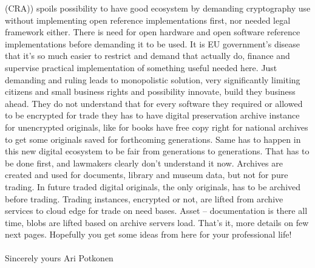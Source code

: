 (CRA)\allowbreak\cite{EU_CRA}) spoils possibility to have good ecosystem by
demanding cryptography use without implementing open reference
implementations first, nor needed legal framework either. There is need for
open hardware and open software reference implementations before demanding it
to be used. It is EU government's disease\allowbreak\cite{
FineTheVolunteerWorker}\allowbreak\cite{EvBatBackBalancedRepairing}
that it's so much easier to restrict and demand that actually do,
finance and supervise practical implementation of something
useful\allowbreak\cite{ContributeToTheVolunteerWork}\allowbreak\cite{
YleMorningOneEuIncEtc} needed here.
Just demanding and ruling leads to monopolistic solution, very
significantly limiting citizens and small business rights and possibility
innovate, build they business ahead. They do not understand that for every
software they required or allowed to be encrypted for trade they has to have
digital preservation archive instance for unencrypted originals, like for
books have free copy right for national archives to get some originals saved
for forthcoming generations. Same has to happen in this new digital ecosystem
to be fair from generations to generations. That has to be done first, and
lawmakers clearly don't understand it now\allowbreak\cite{
EuDigitalFairnessAct}. Archives are created and used for documents, library
and museum data, but not for pure trading. In future traded digital
originals, the only originals, has to be archived before
trading\allowbreak\cite{ECI_2024_000007}\allowbreak\cite{
EULegalDepositScheme}\allowbreak\cite{Vapaakappaleoikeus}. Trading instances,
encrypted or not, are lifted from archive services to cloud edge for trade on
need bases. Asset -- documentation is there all time, blobs are lifted based
on archive servers load. That's it, more details on few next pages. Hopefully
you get some ideas from here for your professional life!\\
\\
Sincerely yours Ari Potkonen
